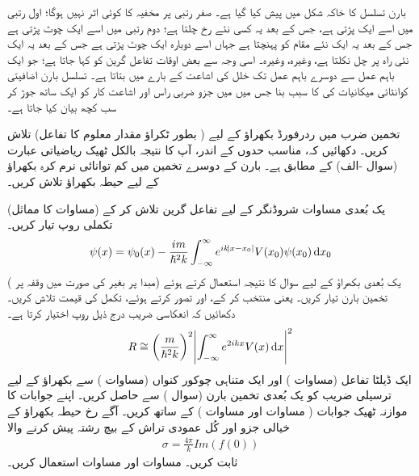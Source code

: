 بارن تسلسل کا خاکہ شکل  میں پیش کیا گیا ہے۔ صفر رتبی  پر مخفیہ کا کوئی اثر نہیں ہوگا؛ اول رتبی میں اسے ایک  پڑتی ہے، جس کے بعد یہ کسی نئے رخ چلتا ہے؛ دوم رتبی میں اسے ایک چوٹ پڑتی ہے جس کے بعد یہ ایک نئے مقام کو پہنچتا ہے جہاں اسے دوبارہ ایک چوٹ پڑتی ہے جس کے بعد یہ ایک نئی راہ پر چل نکلتا ہے، وغیرہ، وغیرہ۔ اسی وجہ سے بعض اوقات تفاعل گرین کو  کہا جاتا ہے؛ جو ایک باہم عمل سے دوسرے باہم عمل تک خلل کی اشاعت کے بارے میں بتاتا ہے۔ تسلسل بارن اضافیتی کوانٹائی میکانیات کی کا سبب بنا جس میں  میں جزو ضربی راس  اور اشاعت کار  کو ایک ساتھ جوڑ کر سب کچھ بیان کیا جاتا ہے۔

تخمین ضرب میں ردرفورڈ بکھراؤ کے لیے  ( بطور ٹکراؤ مقدار معلوم کا تفاعل) تلاش کریں۔ دکھائیں کہ، مناسب حدوں کے اندر، آپ کا نتیجہ بالکل ٹھیک ریاضیاتی عبارت (سوال -الف) کے مطابق ہے۔
بارن کے  دوسرے تخمین میں کم توانائی نرم کرہ بکھراؤ کے لیے حیطہ بکھراؤ تلاش کریں۔

 
یک بُعدی مساوات شروڈنگر کے لیے تفاعل گرین تلاش کر کے (مساوات  کا مماثل) تکملی روپ تیار کریں۔
\begin{align}
	\psi(x)=\psi_0(x)-\frac{im}{\hslash^2k}\int_{-\infty}^{\infty}e^{ik\abs{x-x_0}}V(x_0)\psi(x_0)\dif x_0
\end{align}
یک بُعدی بکھراؤ کے لیے سوال  کا نتیجہ استعمال کرتے ہوئے (مبدا پر بغیر  کی صورت میں وقفہ  پر ) تخمین بارن تیار کریں۔ یعنی  منتخب کر کے، اور  تصور کرتے ہوئے، تکمل کی قیمت تلاش کریں۔ دکھائیں کہ انعکاسی  ضریب  درج ذیل روپ اختیار کرتا ہے۔
\begin{align}
	R\cong\left(\frac{m}{\hslash^2k}\right)^2\abs{\int_{-\infty}^{\infty}e^{2ikx}V(x)\dif x}^2
\end{align}
ایک ڈیلٹا تفاعل (مساوات ) اور ایک متناہی چوکور کنواں (مساوات ) سے بکھراؤ کے لیے ترسیلی  ضریب   کو یک بُعدی تخمین بارن (سوال ) سے حاصل کریں۔ اپنے جوابات کا موازنہ ٹھیک جوابات ( مساوات  اور مساوات ) کے ساتھ کریں۔
آگے رخ حیطہ بکھراؤ کے خیالی جزو اور کُل عمودی تراش کے بیچ رشتہ پیش کرنے والا  
\begin{align}
	\sigma = \frac{4\pi}{k}Im(f(0))
\end{align}
ثابت کریں۔  مساوات  اور مساوات  استعمال کریں۔
